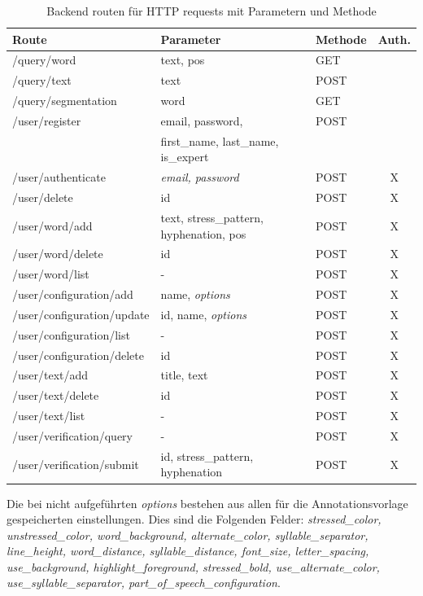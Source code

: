 \begin{table}[h!]
	\centering
	\begin{tabular}{|l|l|l|c|}
		\hline
		\textbf{Route} & \textbf{Parameter} & \textbf{Methode} & \textbf{Auth.}\\
		\hline
		\hline
		/query/word & text, pos & GET & \\
		\hline
		/query/text & text & POST & \\
		\hline
		/query/segmentation& word & GET & \\
		\hline
		\hline
		/user/register & email, password, & POST & \\
		& first\_name, last\_name, is\_expert &&\\
		\hline
		/user/authenticate & \textit{email, password} & POST & X\\
		\hline
		/user/delete & id & POST & X\\
		\hline
		\hline
		/user/word/add& text, stress\_pattern, hyphenation, pos & POST & X\\
		\hline
		/user/word/delete& id & POST & X\\
		\hline
		/user/word/list & - & POST & X\\
		\hline
		\hline
		/user/configuration/add & name, \textit{options} & POST & X\\
		\hline
		/user/configuration/update & id, name, \textit{options}  & POST & X\\
		\hline
		/user/configuration/list & - & POST & X\\
		\hline
		/user/configuration/delete & id & POST & X\\
		\hline
		\hline
		/user/text/add & title, text & POST & X\\
		\hline
		/user/text/delete & id & POST & X\\
		\hline
		/user/text/list & - & POST & X\\
		\hline
		\hline
		/user/verification/query & - & POST & X\\
		\hline
		/user/verification/submit & id, stress\_pattern, hyphenation & POST & X\\
		\hline
	\end{tabular}
	\caption{Backend routen für HTTP requests mit Parametern und Methode}
	\label{table:backendroutes}
\end{table}

Die bei  nicht aufgeführten \textit{options} bestehen aus allen für die Annotationsvorlage gespeicherten einstellungen. Dies sind die Folgenden Felder: \textit{stressed\_color, unstressed\_color, word\_background, alternate\_color, syllable\_separator, line\_height, word\_distance, syllable\_distance, font\_size, letter\_spacing, use\_background, highlight\_foreground, stressed\_bold, use\_alternate\_color, use\_syllable\_separator, part\_of\_speech\_configuration}.

